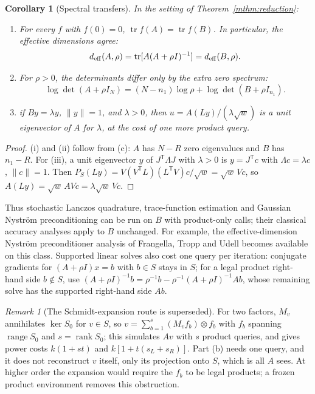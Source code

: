 \documentclass[11pt,a4paper]{article}
\newtheorem{corollary}[theorem]{Corollary}
\theoremstyle{definition}
\theoremstyle{remark}
\newtheorem{remark}[theorem]{Remark}
\numberwithin{equation}{section}
\newcommand{\T}{{\mathsf T}}
\newcommand{\tr}{\operatorname{tr}}
\newcommand{\rank}{\operatorname{rank}}
\newcommand{\range}{\operatorname{range}}
\newcommand{\norm}[1]{\lVert#1\rVert}
\begin{document}
\begin{corollary}[Spectral transfers]\label{cor:spectral}
In the setting of Theorem~\ref{mthm:reduction}:
\begin{enumerate}[label=\textup{(\roman*)}]
\item For every $f$ with $f(0)=0$, $\tr f(A)=\tr f(B)$. In particular, the
      effective dimensions agree:
      \[
       d_{\rm eff}(A,\rho)=\tr[A(A+\rho I)^{-1}]=d_{\rm eff}(B,\rho).
      \]
\item For $\rho>0$, the determinants differ only by the extra zero spectrum:
      \[
       \log\det(A+\rho I_N)
       =(N-n_1)\log\rho+\log\det(B+\rho I_{n_1}).
      \]
\item if $By=\lambda y$, $\norm y=1$, and $\lambda>0$, then $u=A(Ly)/(\lambda\sqrt w)$ is a unit
      eigenvector of $A$ for $\lambda$, at the cost of one more product query.
\end{enumerate}
\end{corollary}

\begin{proof}
(i) and (ii) follow from (c): $A$ has $N-R$ zero eigenvalues and $B$ has
$n_1-R$. For (iii), a unit eigenvector $y$ of $J^\T\Lambda J$ with $\lambda>0$ is
$y=J^\T c$ with $\Lambda c=\lambda c$, $\norm c=1$. Then
$P_S(Ly)=V(V^\T L)(L^\T V)c/\sqrt w=\sqrt w\,Vc$, so
$A(Ly)=\sqrt w\,AVc=\lambda\sqrt w\,Vc$.
\end{proof}

Thus stochastic Lanczos quadrature, trace-function estimation and Gaussian
Nystr\"om preconditioning can be run on $B$ with product-only calls; their
classical accuracy analyses apply to $B$ unchanged. For example, the
effective-dimension Nystr\"om preconditioner analysis of Frangella, Tropp and
Udell \cite{FTU} becomes available on this class. Supported linear solves also
cost one query per iteration: conjugate gradients for $(A+\rho I)x=b$ with
$b\in S$ stays in $S$; for a legal product right-hand side $b\notin S$, use
$(A+\rho I)^{-1}b=\rho^{-1}b-\rho^{-1}(A+\rho I)^{-1}Ab$, whose remaining solve
has the supported right-hand side $Ab$.

\begin{remark}[The Schmidt-expansion route is superseded]
For two factors, $M_v$ annihilates $\ker S_0$ for $v\in S$, so
$v=\sum_{b=1}^{s}(M_vf_b)\otimes f_b$ with $f_b$ spanning $\range S_0$ and
$s=\rank S_0$; this simulates $Av$ with $s$ product queries, and gives power
costs $k(1+st)$ and $k[1+t(s_L+s_R)]$. Part (b) needs one query, and it does not
reconstruct $v$ itself, only its projection onto $S$, which is all $A$ sees.
At higher order the expansion would require the $f_b$ to be legal products; a
frozen product environment removes this obstruction.
\end{remark}
\end{document}
